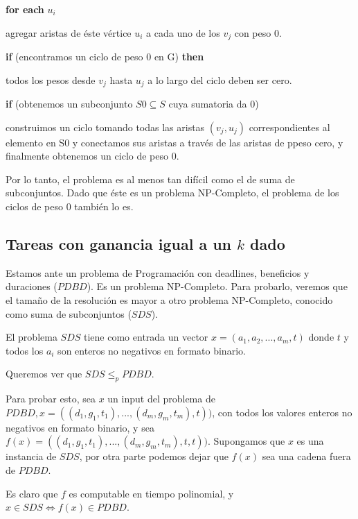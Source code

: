 \documentclass[a4paper,10pt]{article}
\begin{document}
\textbf{\textcolor[rgb]{0.0,0.5019608,0.0}{for each}} \( u_{i} \)

\quad agregar aristas de éste vértice \( u_{i} \) a cada uno de los \( v_{j} \) con peso 0. 

\textbf{\textcolor[rgb]{0.0,0.5019608,0.0}{if}} (encontramos un ciclo de peso 0 en G) \textbf{\textcolor[rgb]{0.0,0.5019608,0.0}{then}}

\quad todos los pesos desde \( v_{j} \) hasta \( u_{j} \) a lo largo del ciclo deben ser cero.
		
\textbf{\textcolor[rgb]{0.0,0.5019608,0.0}{if}} (obtenemos un subconjunto \( S0 \subseteq S \) cuya sumatoria da 0)

\quad construimos un ciclo tomando todas las aristas \( (v_{j}, u_{j}) \) correspondientes al elemento en S0 y conectamos sus aristas a través de las aristas de ppeso cero, y finalmente obtenemos un ciclo de peso 0.

\bigskip

Por lo tanto, el problema es al menos tan difícil como el de suma de subconjuntos. Dado que éste es un problema NP-Completo, el problema de los ciclos de peso 0 también lo es.

\subsection{Tareas con ganancia igual a un \(k\) dado}

Estamos ante un problema de Programación con deadlines, beneficios y duraciones (\(PDBD\)). Es un problema NP-Completo. Para probarlo, veremos que el tamaño de la resolución es mayor a otro problema NP-Completo, conocido como suma de subconjuntos (\(SDS\)).

El problema \(SDS\) tiene como entrada un vector \(x = (a_{1}, a_{2},..., a_{m}, t)\) donde \(t\) y todos los \(a_{i}\) son enteros no negativos en formato binario.

Queremos ver que \(SDS \le_{p} PDBD\).

Para probar esto, sea \(x\) un input del problema de \( PDBD, x = (( d_{1}, g_{1}, t_{1}),...,(d_{m}, g_{m}, t_{m}), t)) \), con todos los valores enteros no negativos en formato binario, y sea \(f(x) =  (( d_{1}, g_{1}, t_{1}),...,(d_{m}, g_{m}, t_{m}), t, t)) \). Supongamos que \(x\) es una instancia de \(SDS\), por otra parte podemos dejar que \(f(x)\) sea una cadena fuera de \(PDBD\).

Es claro que \(f\) es computable en tiempo polinomial, y \( x \in SDS \Leftrightarrow f(x) \in PDBD\).
\end{document}
